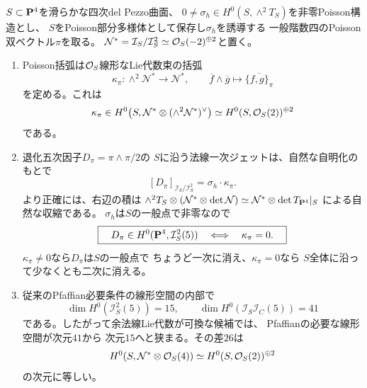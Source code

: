 \begin{theorem}[余法線Lie代数による退化五次因子の重複度判定]
\label{thm:dp-conormal-lie-pfaffian}
$S\subset\mathbf P^4$を滑らかな四次del Pezzo曲面、
$0\ne\sigma_h\in H^0(S,\wedge^2T_S)$を非零Poisson構造とし、
$S$をPoisson部分多様体として保存し$\sigma_h$を誘導する
一般階数四のPoisson双ベクトル$\pi$を取る。
$\mathcal N^*=\mathcal I_S/\mathcal I_S^2
\simeq\mathcal O_S(-2)^{\oplus2}$と置く。
\begin{enumerate}
\item Poisson括弧は$\mathcal O_S$線形なLie代数束の括弧
\begin{equation}\label{eq:dp-conormal-lie}
 \kappa_\pi:\wedge^2\mathcal N^*
   \longrightarrow\mathcal N^*,\qquad
 \overline{f}\wedge\overline{g}
   \longmapsto\overline{\{f,g\}_\pi}
\end{equation}
を定める。これは
\[
 \kappa_\pi\in
 H^0\bigl(S,\mathcal N^*\otimes
              (\wedge^2\mathcal N^*)^\vee\bigr)
 \simeq H^0(S,\mathcal O_S(2))^{\oplus2}
\]
である。
\item 退化五次因子$D_\pi=\pi\wedge\pi/2$の
$S$に沿う法線一次ジェットは、自然な自明化のもとで
\begin{equation}\label{eq:dp-pfaffian-normal-lie}
 \boxed{\quad
 [D_\pi]_{\mathcal I_S/\mathcal I_S^2}
    =\sigma_h\cdot\kappa_\pi.\quad}
\end{equation}
より正確には、右辺の積は
$\wedge^2T_S\otimes(\mathcal N^*\otimes\det\mathcal N)
\simeq\mathcal N^*\otimes\det T_{\mathbf P^4}|_S$
による自然な収縮である。
$\sigma_h$は$S$の一般点で非零なので
\begin{equation}\label{eq:dp-double-vs-abelian}
 \boxed{\quad
 D_\pi\in H^0(\mathbf P^4,\mathcal I_S^2(5))
 \quad\Longleftrightarrow\quad
 \kappa_\pi=0.\quad}
\end{equation}
$\kappa_\pi\ne0$なら$D_\pi$は$S$の一般点で
ちょうど一次に消え、$\kappa_\pi=0$なら
$S$全体に沿って少なくとも二次に消える。
\item 従来のPfaffian必要条件の線形空間の内部で
\[
 \dim H^0(\mathcal I_S^2(5))=15,\qquad
 \dim H^0(\mathcal I_S\mathcal I_C(5))=41
\]
である。したがって余法線Lie代数が可換な候補では、
Pfaffianの必要な線形空間が次元$41$から
次元$15$へと狭まる。その差$26$は
\[
 H^0(S,\mathcal N^*\otimes\mathcal O_S(4))
 \simeq H^0(S,\mathcal O_S(2))^{\oplus2}
\]
の次元に等しい。
\end{enumerate}
\end{theorem}
